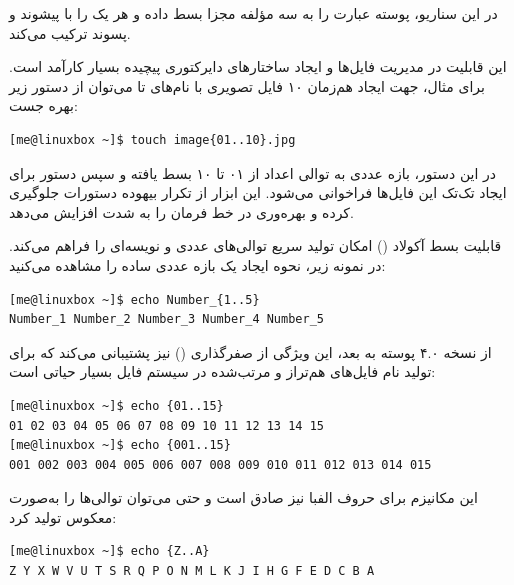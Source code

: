 در این سناریو، پوسته عبارت  را به سه مؤلفه مجزا بسط داده و هر یک را با پیشوند  و پسوند  ترکیب می‌کند.

این قابلیت در مدیریت فایل‌ها و ایجاد ساختارهای دایرکتوری پیچیده بسیار کارآمد است. برای مثال، جهت ایجاد هم‌زمان ۱۰ فایل تصویری با نام‌های  تا  می‌توان از دستور زیر بهره جست:

\begin{latin}
\begin{lstlisting}
[me@linuxbox ~]$ touch image{01..10}.jpg
\end{lstlisting}
\end{latin}

در این دستور، بازه عددی  به توالی اعداد از ۰۱ تا ۱۰ بسط یافته و سپس دستور  برای ایجاد تک‌تک این فایل‌ها فراخوانی می‌شود. این ابزار از تکرار بیهوده دستورات جلوگیری کرده و بهره‌وری در خط فرمان را به شدت افزایش می‌دهد.

قابلیت بسط آکولاد () امکان تولید سریع توالی‌های عددی و نویسه‌ای را فراهم می‌کند. در نمونه زیر، نحوه ایجاد یک بازه عددی ساده را مشاهده می‌کنید:

\begin{latin}
\begin{lstlisting}
[me@linuxbox ~]$ echo Number_{1..5}
Number_1 Number_2 Number_3 Number_4 Number_5
\end{lstlisting}
\end{latin}

از نسخه ۴.۰ پوسته  به بعد، این ویژگی از صفرگذاری () نیز پشتیبانی می‌کند که برای تولید نام فایل‌های هم‌تراز و مرتب‌شده در سیستم فایل بسیار حیاتی است:

\begin{latin}
\begin{lstlisting}
[me@linuxbox ~]$ echo {01..15}
01 02 03 04 05 06 07 08 09 10 11 12 13 14 15
[me@linuxbox ~]$ echo {001..15}
001 002 003 004 005 006 007 008 009 010 011 012 013 014 015
\end{lstlisting}
\end{latin}

این مکانیزم برای حروف الفبا نیز صادق است و حتی می‌توان توالی‌ها را به‌صورت معکوس تولید کرد:

\begin{latin}
\begin{lstlisting}
[me@linuxbox ~]$ echo {Z..A}
Z Y X W V U T S R Q P O N M L K J I H G F E D C B A
\end{lstlisting}
\end{latin}

